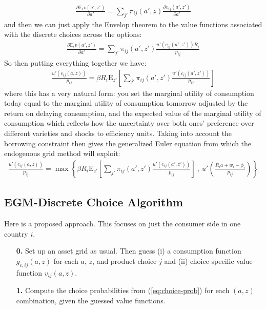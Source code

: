 \documentclass[12pt,pdftex]{article}
\begin{document}
\begin{onehalfspacing}
\begin{align}
\frac{\partial \mathbb{E}_{\epsilon} v(a', z')}{\partial a'} = \sum_{j'} \pi_{ij}(a', z) \frac{\partial v_{ij}(a', z')}{\partial a'}
\end{align}
and then we can just apply the Envelop theorem to the value functions associated with the discrete choices across the options:
\begin{align}
\frac{\partial \mathbb{E}_{\epsilon} v(a', z')}{\partial a'} = \sum_{j'} \pi_{ij}(a', z') \frac{u'(c_{ij}(a', z'))R_{i}}{p_{ij}}
\end{align}
So then putting everything together we have:
\begin{align}
\frac{u'(c_{ij}(a, z))}{p_{ij}} = \beta R_{i} \mathrm{E}_{z'} \left[ \sum_{j'} \pi_{ij}(a', z') \frac{u'(c_{ij}(a', z'))}{p_{ij}} \right]
\end{align}
where this has a very natural form: you set the marginal utility of consumption today equal to the marginal utility of consumption tomorrow adjusted by the return on delaying consumption, and the expected value of the marginal utility of consumption which reflects how the uncertainty over both ones' preference over different varieties and shocks to efficiency units. Taking into account the borrowing constraint then gives the generalized Euler equation from which the endogenous grid method will exploit:
\begin{align}
\frac{u'(c_{ij}(a, z))}{p_{ij}} = \max \left\{ \beta R_{i} \mathrm{E}_{z'} \left[ \sum_{j'} \pi_{ij}(a', z') \frac{u'(c_{ij}(a', z'))}{p_{ij}} \right] \ , \  u' \left( \frac{R_i a + w_i - \phi_{i}}{p_{ij}} \right) \right \}
\label{eq:euler_equation}
\end{align}

\subsection{EGM-Discrete Choice Algorithm}

Here is a proposed approach. This focuses on just the consumer side in one country $i$.
\begin{itemize}
\item[\textbf{0.}] Set up an asset grid as usual. Then guess (i) a consumption function $g_{c,ij}(a,z)$ for each $a$, $z$, and product choice $j$ and (ii) choice specific value function $v_{ij}(a,z)$.

\item[\textbf{1.}] Compute the choice probabilities from (\ref{eq:choice-prob}) for each $(a,z)$ combination, given the guessed value functions.


\end{itemize}
\end{onehalfspacing}
\end{document}
